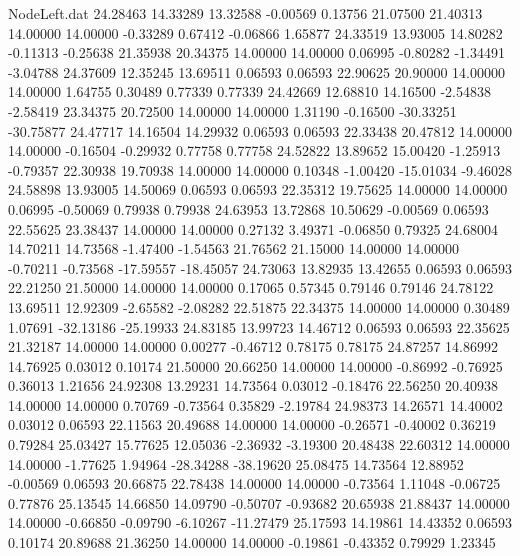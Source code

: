 \begin{filecontents}{NodeLeft.dat}
  24.28463   14.33289   13.32588    -0.00569    0.13756   21.07500   21.40313   14.00000   14.00000   -0.33289    0.67412   -0.06866    1.65877
  24.33519   13.93005   14.80282    -0.11313   -0.25638   21.35938   20.34375   14.00000   14.00000    0.06995   -0.80282   -1.34491   -3.04788
  24.37609   12.35245   13.69511     0.06593    0.06593   22.90625   20.90000   14.00000   14.00000    1.64755    0.30489    0.77339    0.77339
  24.42669   12.68810   14.16500    -2.54838   -2.58419   23.34375   20.72500   14.00000   14.00000    1.31190   -0.16500  -30.33251  -30.75877
  24.47717   14.16504   14.29932     0.06593    0.06593   22.33438   20.47812   14.00000   14.00000   -0.16504   -0.29932    0.77758    0.77758
  24.52822   13.89652   15.00420    -1.25913   -0.79357   22.30938   19.70938   14.00000   14.00000    0.10348   -1.00420  -15.01034   -9.46028
  24.58898   13.93005   14.50069     0.06593    0.06593   22.35312   19.75625   14.00000   14.00000    0.06995   -0.50069    0.79938    0.79938
  24.63953   13.72868   10.50629    -0.00569    0.06593   22.55625   23.38437   14.00000   14.00000    0.27132    3.49371   -0.06850    0.79325
  24.68004   14.70211   14.73568    -1.47400   -1.54563   21.76562   21.15000   14.00000   14.00000   -0.70211   -0.73568  -17.59557  -18.45057
  24.73063   13.82935   13.42655     0.06593    0.06593   22.21250   21.50000   14.00000   14.00000    0.17065    0.57345    0.79146    0.79146
  24.78122   13.69511   12.92309    -2.65582   -2.08282   22.51875   22.34375   14.00000   14.00000    0.30489    1.07691  -32.13186  -25.19933
  24.83185   13.99723   14.46712     0.06593    0.06593   22.35625   21.32187   14.00000   14.00000    0.00277   -0.46712    0.78175    0.78175
  24.87257   14.86992   14.76925     0.03012    0.10174   21.50000   20.66250   14.00000   14.00000   -0.86992   -0.76925    0.36013    1.21656
  24.92308   13.29231   14.73564     0.03012   -0.18476   22.56250   20.40938   14.00000   14.00000    0.70769   -0.73564    0.35829   -2.19784
  24.98373   14.26571   14.40002     0.03012    0.06593   22.11563   20.49688   14.00000   14.00000   -0.26571   -0.40002    0.36219    0.79284
  25.03427   15.77625   12.05036    -2.36932   -3.19300   20.48438   22.60312   14.00000   14.00000   -1.77625    1.94964  -28.34288  -38.19620
  25.08475   14.73564   12.88952    -0.00569    0.06593   20.66875   22.78438   14.00000   14.00000   -0.73564    1.11048   -0.06725    0.77876
  25.13545   14.66850   14.09790    -0.50707   -0.93682   20.65938   21.88437   14.00000   14.00000   -0.66850   -0.09790   -6.10267  -11.27479
  25.17593   14.19861   14.43352     0.06593    0.10174   20.89688   21.36250   14.00000   14.00000   -0.19861   -0.43352    0.79929    1.23345

\end{filecontents}
